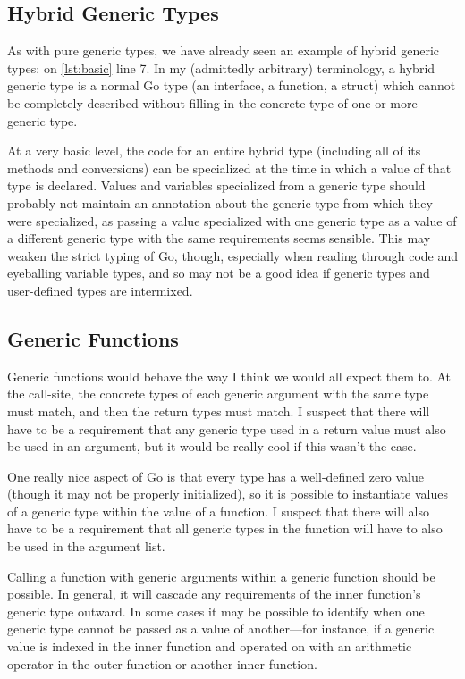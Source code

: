 \documentclass[10pt,a4paper]{article}
\newcommand{\Listing}[1]{\autoref{lst:#1}}
\begin{document}
\subsection{Hybrid Generic Types}
As with pure generic types, we have already seen an example of hybrid generic types: on \Listing{basic} line 7.  In my (admittedly arbitrary) terminology, a hybrid generic type is a normal Go type (an interface, a function, a struct) which cannot be completely described without filling in the concrete type of one or more generic type.

At a very basic level, the code for an entire hybrid type (including all of its methods and conversions) can be specialized at the time in which a value of that type is declared.  Values and variables specialized from a generic type should probably not maintain an annotation about the generic type from which they were specialized, as passing a value specialized with one generic type as a value of a different generic type with the same requirements seems sensible.  This may weaken the strict typing of Go, though, especially when reading through code and eyeballing variable types, and so may not be a good idea if generic types and user-defined types are intermixed.

\subsection{Generic Functions}
\label{sec:genfunc}
Generic functions would behave the way I think we would all expect them to.  At the call-site, the concrete types of each generic argument with the same type must match, and then the return types must match.  I suspect that there will have to be a requirement that any generic type used in a return value must also be used in an argument, but it would be really cool if this wasn't the case.

One really nice aspect of Go is that every type has a well-defined zero value (though it may not be properly initialized), so it is possible to instantiate values of a generic type within the value of a function.  I suspect that there will also have to be a requirement that all generic types in the function will have to also be used in the argument list.

Calling a function with generic arguments within a generic function should be possible.  In general, it will cascade any requirements of the inner function's generic type outward.  In some cases it may be possible to identify when one generic type cannot be passed as a value of another---for instance, if a generic value is indexed in the inner function and operated on with an arithmetic operator in the outer function or another inner function.
\end{document}
